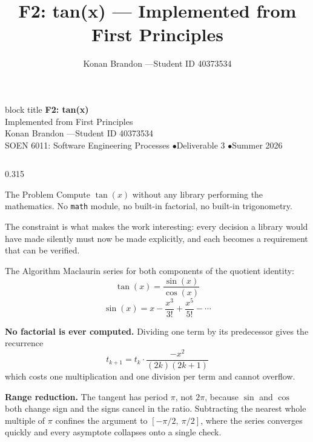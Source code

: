 \documentclass[final]{beamer}
\title{\huge F2: tan(x) --- Implemented from First Principles}
\author{Konan Brandon \quad ---\quad Student ID 40373534}
\institute{SOEN 6011: Software Engineering Processes ---
           Deliverable 3 --- Summer 2026}
\date{}
\begin{document}
\begin{frame}[t]

\begin{beamercolorbox}[wd=\paperwidth,sep=0.6cm,center]{block title}
  \vskip0.3cm
  {\veryHuge\bfseries F2: tan(x)}\\[0.5cm]
  {\Huge Implemented from First Principles}\\[0.6cm]
  {\Large Konan Brandon \quad---\quad Student ID 40373534}\\[0.25cm]
  {\large SOEN 6011: Software Engineering Processes
   \quad$\bullet$\quad Deliverable 3 \quad$\bullet$\quad Summer 2026}
  \vskip0.3cm
\end{beamercolorbox}

\vskip1.5cm

\begin{columns}[t]

\begin{column}{0.315\textwidth}

\begin{block}{The Problem}
  Compute $\tan(x)$ without any library performing the mathematics.
  No \texttt{math} module, no built-in factorial, no built-in
  trigonometry.
  \vspace{0.4cm}

  The constraint is what makes the work interesting: every decision a
  library would have made silently must now be made explicitly, and
  each becomes a requirement that can be verified.
\end{block}

\begin{block}{The Algorithm}
  Maclaurin series for both components of the quotient identity:
  \[ \tan(x) = \frac{\sin(x)}{\cos(x)} \]
  \[ \sin(x) = x - \frac{x^{3}}{3!} + \frac{x^{5}}{5!} - \cdots \]
  \vspace{0.2cm}

  \textbf{No factorial is ever computed.} Dividing one term by its
  predecessor gives the recurrence
  \[ t_{k+1} = t_{k}\cdot\frac{-x^{2}}{(2k)(2k+1)} \]
  which costs one multiplication and one division per term and cannot
  overflow.
  \vspace{0.4cm}

  \textbf{Range reduction.} The tangent has period $\pi$, not $2\pi$,
  because $\sin$ and $\cos$ both change sign and the signs cancel in
  the ratio. Subtracting the nearest whole multiple of $\pi$ confines
  the argument to $[-\pi/2,\ \pi/2]$, where the series converges
  quickly and every asymptote collapses onto a single check.
  \vspace{0.4cm}


\end{block}
\end{column}
\end{columns}
\end{frame}
\end{document}
